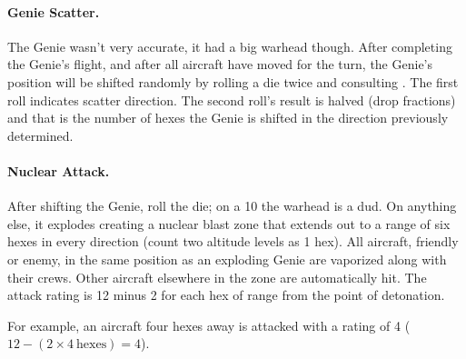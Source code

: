 \paragraph{Genie Scatter.} The Genie wasn't very accurate, it had a big warhead though. After completing the Genie's flight, and after all aircraft have moved for the turn, the Genie’s position will be shifted randomly by rolling a die twice and consulting . The first roll indicates scatter direction. The second roll's result is halved (drop fractions) and that is the number of hexes the Genie is shifted in the direction previously determined. 

\paragraph{Nuclear Attack.} After shifting the Genie, roll the die; on a 10 the warhead is a dud. On anything else, it explodes creating a nuclear blast zone that extends out to a range of six hexes in every direction (count two altitude levels as 1 hex). All aircraft, friendly or enemy, in the same position as an exploding Genie are vaporized along with their crews. Other aircraft elsewhere in the zone are automatically hit. The attack rating is 12 minus 2 for each hex of range from the point of detonation.

For example, an aircraft four hexes away is attacked with a rating of 4 ($12 - (2 \times 4\ \mathrm{hexes}) = 4$).
